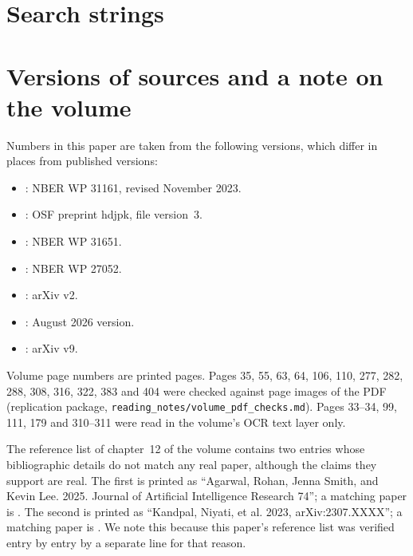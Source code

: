\documentclass[12pt]{article}
\theoremstyle{remark}
\begin{document}
\section{Search strings}\label{app:search}


\section{Versions of sources and a note on the volume}\label{app:versions}\label{app:volume}
Numbers in this paper are taken from the following versions, which differ in places from published versions:
\begin{itemize}[itemsep=0pt]
\item \citet{brynjolfsson2025work}: NBER WP 31161, revised November 2023.
\item \citet{otis2026uneven}: OSF preprint hdjpk, file version~3.
\item \citet{dube2025policing}: NBER WP 31651.
\item \citet{acemoglu2020tax}: NBER WP 27052.
\item \citet{steyvers2025know}: arXiv v2.
\item \citet{brynjolfsson2025canaries}: August 2026 version.
\item \citet{ide2025automation}: arXiv v9.
\end{itemize}
Volume page numbers are printed pages. Pages 35, 55, 63, 64, 106, 110, 277, 282, 288, 308, 316, 322, 383 and 404 were checked against page images of the PDF (replication package, \texttt{reading\_notes/volume\_pdf\_checks.md}). Pages 33--34, 99, 111, 179 and 310--311 were read in the volume's OCR text layer only.

The reference list of chapter~12 of the volume contains two entries whose bibliographic details do not match any real paper, although the claims they support are real. The first is printed as ``Agarwal, Rohan, Jenna Smith, and Kevin Lee. 2025. Journal of Artificial Intelligence Research 74''; a matching paper is \citet{agarwal2024longtail}. The second is printed as ``Kandpal, Niyati, et al. 2023, arXiv:2307.XXXX''; a matching paper is \citet{kandpal2023longtail}. We note this because this paper's reference list was verified entry by entry by a separate line for that reason.
\end{document}
